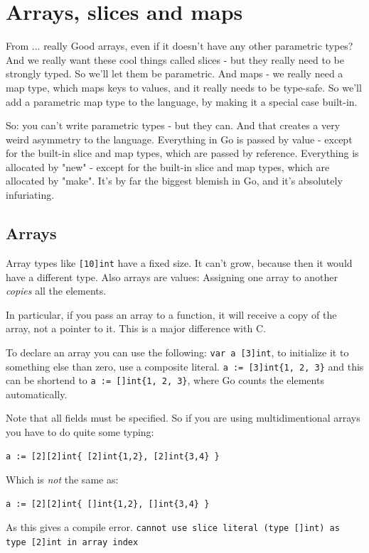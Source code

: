 \section{Arrays, slices and maps}
From \cite{go_intro} ... really Good
%
arrays, even if it doesn't have any other parametric types? And we really want
these cool things called slices - but they really need to be strongly typed. So
we'll let them be parametric. And maps - we really need a map type, which maps
keys to values, and it really needs to be type-safe. So we'll add a parametric
map type to the language, by making it a special case built-in.

So: you can't write parametric types - but they can. And that creates a very
weird asymmetry to the language. Everything in Go is passed by value - except
for the built-in slice and map types, which are passed by reference. Everything
is allocated by "new" - except for the built-in slice and map types, which are
allocated by "make". It's by far the biggest blemish in Go, and it's absolutely
infuriating.

\subsection{Arrays}
Array types like \lstinline{[10]int} have a fixed size. 
It can't grow, because then it would have a different type. Also arrays
are values: Assigning one array to another \emph{copies} all the elements.

In particular, if you pass an array to a function, it will receive a
copy of the array, not a pointer to it. This is a major difference with C.

To declare an array you can use the following: \lstinline{var a [3]int},
to initialize it to something else than zero, use a composite literal.
\lstinline|a := [3]int{1, 2, 3}| and
this can be shortend to \lstinline|a := []int{1, 2, 3}|, where Go counts
the elements automatically.

Note that all fields must be specified.  So if you are using multidimentional
arrays you have to do quite some typing:
\begin{lstlisting}
a := [2][2]int{ [2]int{1,2}, [2]int{3,4} }
\end{lstlisting}
Which is \emph{not} the same as:
\begin{lstlisting}
a := [2][2]int{ []int{1,2}, []int{3,4} }
\end{lstlisting}
As this gives a compile error.\newline
\lstinline{cannot use slice literal (type []int) as type [2]int in array index}

